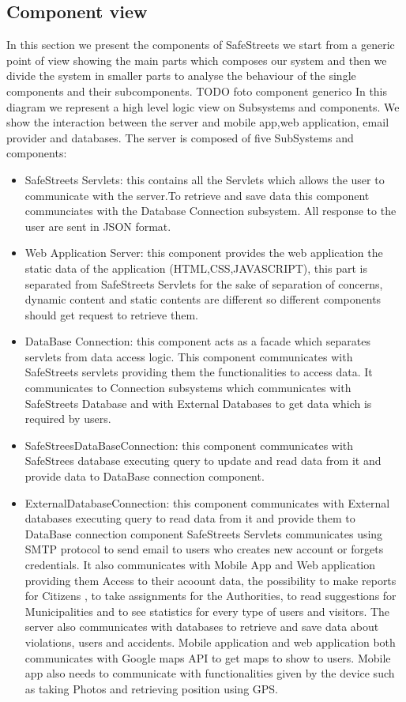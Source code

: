 \subsection{Component view}
In this section we present the components of SafeStreets we start from a generic point of view showing the main parts which composes our system and then we divide the system in smaller parts to analyse the behaviour of the single components and their subcomponents.
TODO foto component generico
In this diagram we represent a high level logic view on Subsystems and components. We show the interaction between the server and mobile app,web application, email provider and databases.
The server is composed of five SubSystems and components:
\begin{itemize}
\item SafeStreets Servlets: this contains all the Servlets which allows the user to communicate with the server.To retrieve and save data this component communciates with the Database Connection subsystem. All response to the user are sent in JSON format. 
\item Web Application Server: this component provides the web application the static data of the application (HTML,CSS,JAVASCRIPT), this part is separated from SafeStreets Servlets for the sake of separation of concerns, dynamic content and static contents are different so different components should get request to retrieve them.
\item DataBase Connection: this component acts as a facade which separates servlets from data access logic. This component communicates with SafeStreets servlets providing them the functionalities to access data.
It communicates to Connection subsystems which communicates with SafeStreets Database and with External Databases to get data which is required by users.
\item SafeStreesDataBaseConnection: this component communicates with SafeStrees database executing query to update and read data from it and provide data to DataBase connection component. 
\item ExternalDatabaseConnection: this component communicates with External databases executing query to read data from it and provide them to DataBase connection component
SafeStreets Servlets communicates using SMTP protocol to send email to users who creates new account or forgets credentials. It also communicates with Mobile App and Web application providing them Access to their acoount data, the possibility to make reports for Citizens , to take assignments for the Authorities, to read suggestions for Municipalities and to see statistics for every type of users and visitors.
The server also communicates with databases to retrieve and save data about violations, users and accidents.
Mobile application and web application both communicates with Google maps API  to get maps to show to users. Mobile app also needs to communicate with functionalities given by the device such as taking Photos and retrieving position using GPS.
\end{itemize}
